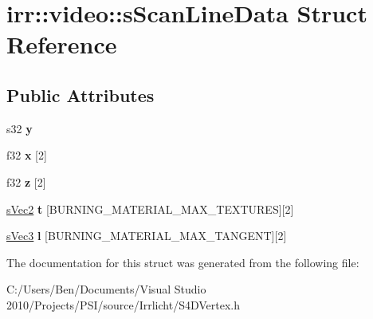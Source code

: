 \hypertarget{structirr_1_1video_1_1s_scan_line_data}{\section{irr\-:\-:video\-:\-:s\-Scan\-Line\-Data Struct Reference}
\label{structirr_1_1video_1_1s_scan_line_data}
}
\subsection*{Public Attributes}
\begin{DoxyCompactItemize}
\item 
\hypertarget{structirr_1_1video_1_1s_scan_line_data_a1f47959b20cc29ad1f68ff87776f3a13}{s32 {\bfseries y}}\label{structirr_1_1video_1_1s_scan_line_data_a1f47959b20cc29ad1f68ff87776f3a13}

\item 
\hypertarget{structirr_1_1video_1_1s_scan_line_data_a3fc565750498494602ce2e48bff26a5c}{f32 {\bfseries x} \mbox{[}2\mbox{]}}\label{structirr_1_1video_1_1s_scan_line_data_a3fc565750498494602ce2e48bff26a5c}

\item 
\hypertarget{structirr_1_1video_1_1s_scan_line_data_a3b45e510576b6df7d4675319118f864c}{f32 {\bfseries z} \mbox{[}2\mbox{]}}\label{structirr_1_1video_1_1s_scan_line_data_a3b45e510576b6df7d4675319118f864c}

\item 
\hypertarget{structirr_1_1video_1_1s_scan_line_data_a76f0a1a1bd522dde0a2bdeb33ce1c165}{\hyperlink{structirr_1_1video_1_1s_vec2}{s\-Vec2} {\bfseries t} \mbox{[}B\-U\-R\-N\-I\-N\-G\-\_\-\-M\-A\-T\-E\-R\-I\-A\-L\-\_\-\-M\-A\-X\-\_\-\-T\-E\-X\-T\-U\-R\-E\-S\mbox{]}\mbox{[}2\mbox{]}}\label{structirr_1_1video_1_1s_scan_line_data_a76f0a1a1bd522dde0a2bdeb33ce1c165}

\item 
\hypertarget{structirr_1_1video_1_1s_scan_line_data_a4844875a29108461aac166be396f8839}{\hyperlink{structirr_1_1video_1_1s_vec3}{s\-Vec3} {\bfseries l} \mbox{[}B\-U\-R\-N\-I\-N\-G\-\_\-\-M\-A\-T\-E\-R\-I\-A\-L\-\_\-\-M\-A\-X\-\_\-\-T\-A\-N\-G\-E\-N\-T\mbox{]}\mbox{[}2\mbox{]}}\label{structirr_1_1video_1_1s_scan_line_data_a4844875a29108461aac166be396f8839}

\end{DoxyCompactItemize}


The documentation for this struct was generated from the following file\-:\begin{DoxyCompactItemize}
\item 
C\-:/\-Users/\-Ben/\-Documents/\-Visual Studio 2010/\-Projects/\-P\-S\-I/source/\-Irrlicht/S4\-D\-Vertex.\-h\end{DoxyCompactItemize}

